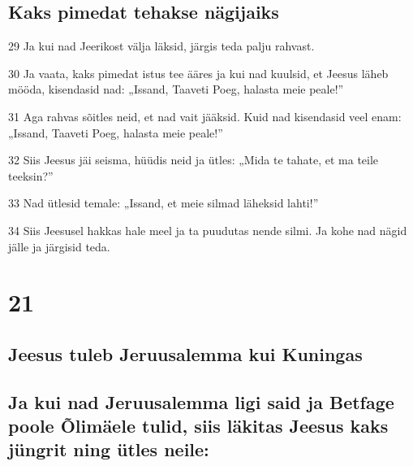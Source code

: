 \section*{Kaks pimedat tehakse nägijaiks}

\par 29 Ja kui nad Jeerikost välja läksid, järgis teda palju rahvast.
\par 30 Ja vaata, kaks pimedat istus tee ääres ja kui nad kuulsid, et Jeesus läheb mööda, kisendasid nad: „Issand, Taaveti Poeg, halasta meie peale!”
\par 31 Aga rahvas sõitles neid, et nad vait jääksid. Kuid nad kisendasid veel enam: „Issand, Taaveti Poeg, halasta meie peale!”
\par 32 Siis Jeesus jäi seisma, hüüdis neid ja ütles: „Mida te tahate, et ma teile teeksin?”
\par 33 Nad ütlesid temale: „Issand, et meie silmad läheksid lahti!”
\par 34 Siis Jeesusel hakkas hale meel ja ta puudutas nende silmi. Ja kohe nad nägid jälle ja järgisid teda.


\chapter{21}

\section*{Jeesus tuleb Jeruusalemma kui Kuningas}


\section*{Ja kui nad Jeruusalemma ligi said ja Betfage poole Õlimäele tulid, siis läkitas Jeesus kaks jüngrit ning ütles neile:}

